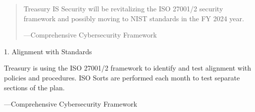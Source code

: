 \begin{formal}

          \begin{quote}
                    
                    Treasury IS Security will be revitalizing the ISO 27001/2 security framework and possibly moving to NIST standards in the FY 2024 year.
                    
                    \begin{flushright}
                              ---Comprehensive Cybersecurity Framework
                    \end{flushright}
                    
          \end{quote}
          
\end{formal}


\begin{formal}

          \begin{description}
                    \item[1. Alignment with Standards]
          \end{description}
          
          \begin{adjustwidth}{2.25em}{}
          
                    Treasury is using the ISO 27001/2 framework to identify and test alignment with policies and procedures. ISO Sorts are performed each month to test separate sections of the plan.
                    
          \end{adjustwidth}
          
                    \begin{flushright}
                              ---Comprehensive Cybersecurity Framework
                    \end{flushright}
                    
\end{formal}
          
                    